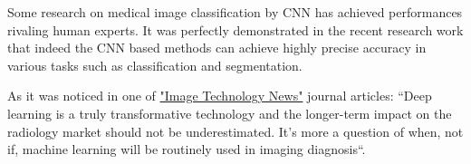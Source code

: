 Some research on medical image classification by CNN has achieved performances rivaling human experts. It was perfectly demonstrated in the recent research work \cite{Anwar2018} that indeed the CNN based methods can achieve highly precise accuracy in various tasks such as classification and segmentation. 

As it was noticed in one of  \href{https://www.itnonline.com/content/deep-learning-medical-imaging-create-300-million-market-2021}{"Image Technology News"} journal articles: ``Deep learning is a truly transformative technology and the longer-term impact on the radiology market should not be underestimated. It’s more a question of when, not if, machine learning will be routinely used in imaging diagnosis``. 


